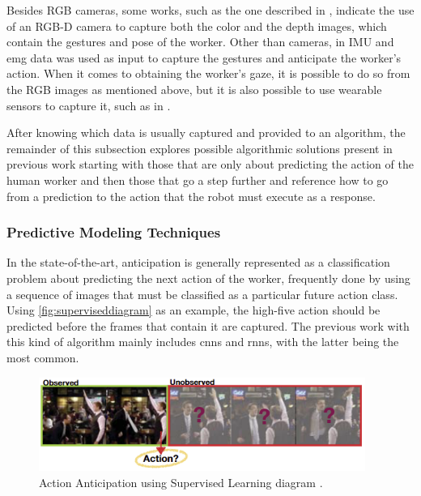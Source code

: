 Besides RGB cameras, some works, such as the one described in \textcite{Moutinho2023}, indicate the use of an RGB-D camera to capture both the color and the depth images, which contain the gestures and pose of the worker. Other than cameras, in \textcite{Tortora2019} IMU and \acs{emg} data was used as input to capture the gestures and anticipate the worker's action. When it comes to obtaining the worker's gaze, it is possible to do so from the RGB images as mentioned above, but it is also possible to use wearable sensors to capture it, such as in \textcite{Schydlo2018}.


After knowing which data is usually captured and provided to an algorithm, the remainder of this subsection explores possible algorithmic solutions present in previous work starting with those that are only about predicting the action of the human worker and then those that go a step further and reference how to go from a prediction to the action that the robot must execute as a response.

\subsubsection{Predictive Modeling Techniques}

In the state-of-the-art, anticipation is generally represented as a classification problem about predicting the next action of the worker, frequently done by using a sequence of images that must be classified as a particular future action class. Using \autoref{fig:superviseddiagram} as an example, the high-five action should be predicted before the frames that contain it are captured. The previous work with this kind of algorithm mainly includes \acfp{cnn} and \acfp{rnn}, with the latter being the most common.

\begin{figure}[ht]
    \centering
    \includegraphics[width=0.95\textwidth]{figs/superviseddiagram.PNG}
    \caption[Action Anticipation using Supervised Learning diagram.]{Action Anticipation using Supervised Learning diagram \cite{Gammulle2019}.}
    \label{fig:superviseddiagram}
\end{figure}

